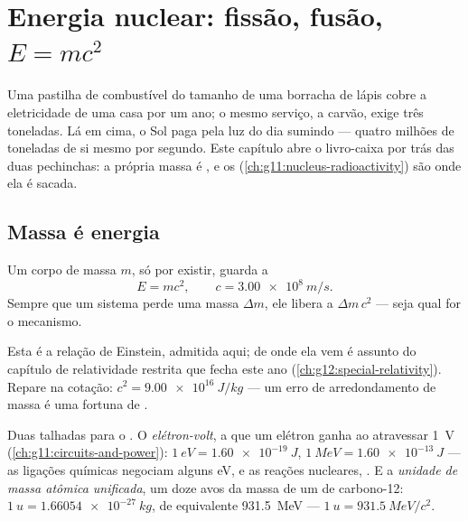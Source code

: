 \chapter{Energia nuclear: fissão, fusão, $E=mc^2$}\label{ch:g12:nuclear-energy}

Uma pastilha de combustível do tamanho de uma borracha de lápis cobre a eletricidade de
uma casa por um ano; o mesmo serviço, a carvão, exige três toneladas. Lá em cima, o Sol
paga pela luz do dia sumindo --- quatro milhões de toneladas de si mesmo por segundo.
Este capítulo abre o livro-caixa por trás das duas pechinchas: a própria massa é ,
e os  (\cref{ch:g11:nucleus-radioactivity}) são onde ela é sacada.

\section{Massa é energia}

\begin{theorem}\label{thm:g12:nuclear-energy:emc2}
Um corpo de massa $m$, só por existir, guarda a 
\[
E = m c^2, \qquad c = \qty{3.00e8}{m/s}.
\]
Sempre que um sistema perde uma massa $\Delta m$, ele libera a 
$\Delta m\, c^2$ --- seja qual for o mecanismo.
\end{theorem}
\admitted

\begin{remark}[Einstein, 1905]\label{rem:g12:nuclear-energy:einstein}
Esta é a relação de Einstein, admitida aqui; de onde ela vem é assunto do capítulo de
relatividade restrita que fecha este ano (\cref{ch:g12:special-relativity}). Repare na
cotação: $c^2 = \qty{9.00e16}{J/kg}$ --- um erro de arredondamento de massa é uma
fortuna de .
\end{remark}

\begin{definition}\label{def:g12:nuclear-energy:units}
Duas  talhadas para o . O \emph{elétron-volt}, a
 que um elétron ganha ao atravessar \qty{1}{V}
(\cref{ch:g11:circuits-and-power}): $\qty{1}{eV} = \qty{1.60e-19}{J}$,
$\qty{1}{MeV} = \qty{1.60e-13}{J}$ --- as ligações químicas negociam alguns \unit{eV}, e
as reações nucleares, . E a \emph{unidade de massa atômica
unificada}, um doze avos da massa de um 
de carbono-12: $\qty{1}{u} = \qty{1.66054e-27}{kg}$, de  equivalente
\qty{931.5}{MeV} --- $\qty{1}{u} = \qty{931.5}{MeV}/c^2$.
\end{definition}

